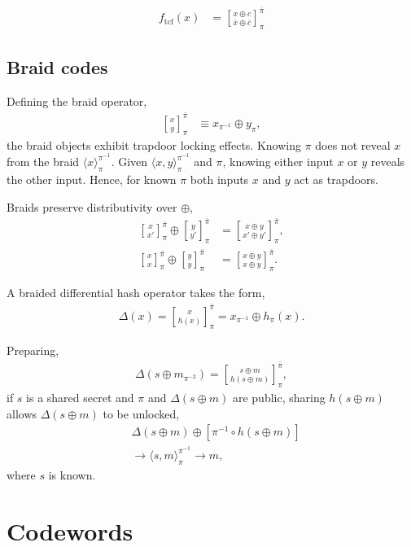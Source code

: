 \documentclass[twocolumn, aps, amsmath, amssymb, nofootinbib, superscriptaddress, longbibliography, doublefloatfix, table-of-contents, eqsecnum, rmp]{revtex4-2}
\def\symbraid#1{\langle#1\rangle_{\pi}^{\pi^{-1}}}
\newcommand{\stackbraid}[2]{{\genfrac{[}{]}{0pt}{}{{#1}}{{#2}}}^{\bar{\pi}}_{\pi}}
\begin{document}
\begin{align}
	f_\mathrm{tcf}(x) &= \stackbraid{x\oplus c}{\overline{x}\oplus \overline{c}}
\end{align}

\subsection{Braid codes}

Defining the braid operator,
\begin{align}
	\stackbraid{x}{y} &\equiv x_{\pi^{-1}} \oplus y_{\pi},
\end{align}
the braid objects exhibit trapdoor locking effects. Knowing $\pi$ does not reveal $x$ from the braid $\symbraid{x}$. Given $\symbraid{x,y}$ and $\pi$, knowing either input $x$ or $y$ reveals the other input. Hence, for known $\pi$ both inputs $x$ and $y$ act as trapdoors.

Braids preserve distributivity over $\oplus$,
\begin{align}
	\stackbraid{x}{x'} \oplus \stackbraid{y}{y'} &= \stackbraid{x\oplus y}{x'\oplus y'},\nonumber\\
	\stackbraid{x}{x} \oplus \stackbraid{y}{y} &= \stackbraid{x\oplus y}{x\oplus y}.
\end{align}

A braided differential hash operator takes the form,
\begin{align}
	\Delta(x) = \stackbraid{x}{h(x)} = x_{\pi^{-1}} \oplus h_{\pi}(x).
\end{align}

Preparing,
\begin{align}
	\Delta(s\oplus m_{\pi^{-2}}) = \stackbraid{s\oplus m}{h(s\oplus m)},
\end{align}
if $s$ is a shared secret and $\pi$ and $\Delta(s\oplus m)$ are public, sharing $h(s\oplus m)$ allows $\Delta(s\oplus m)$ to be unlocked,
\begin{align}
	&\Delta(s\oplus m) \oplus [\pi^{-1}\circ h(s\oplus m)]\nonumber\\
	&\to \symbraid{s,m} \to m,
\end{align}
where $s$ is known.

\section{Codewords}
\end{document}
